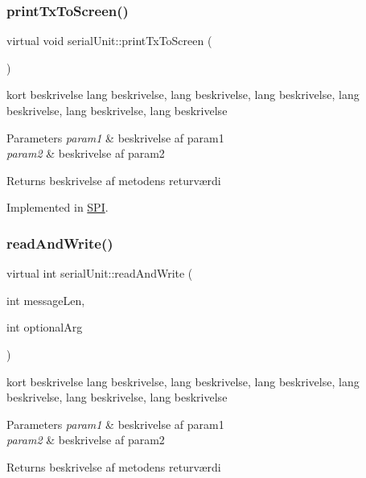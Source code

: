 \subsubsection{\texorpdfstring{print\+Tx\+To\+Screen()}{printTxToScreen()}}
{\footnotesize\ttfamily virtual void serial\+Unit\+::print\+Tx\+To\+Screen (\begin{DoxyParamCaption}{ }\end{DoxyParamCaption})\hspace{0.3cm}{\ttfamily [pure virtual]}}



kort beskrivelse lang beskrivelse, lang beskrivelse, lang beskrivelse, lang beskrivelse, lang beskrivelse, lang beskrivelse 


\begin{DoxyParams}{Parameters}
{\em param1} & beskrivelse af param1 \\
\hline
{\em param2} & beskrivelse af param2 \\
\hline
\end{DoxyParams}
\begin{DoxyReturn}{Returns}
beskrivelse af metodens returværdi 
\end{DoxyReturn}


Implemented in \hyperlink{classSPI_a54c4ecb02366f1e31d2e6f4aa6db8f7d}{S\+PI}.

\mbox{\label{classserialUnit_a5d5573f6d367d8e191df6b8044a81a62}} 
\subsubsection{\texorpdfstring{read\+And\+Write()}{readAndWrite()}}
{\footnotesize\ttfamily virtual int serial\+Unit\+::read\+And\+Write (\begin{DoxyParamCaption}\item[{int}]{message\+Len,  }\item[{int}]{optional\+Arg }\end{DoxyParamCaption})\hspace{0.3cm}{\ttfamily [pure virtual]}}



kort beskrivelse lang beskrivelse, lang beskrivelse, lang beskrivelse, lang beskrivelse, lang beskrivelse, lang beskrivelse 


\begin{DoxyParams}{Parameters}
{\em param1} & beskrivelse af param1 \\
\hline
{\em param2} & beskrivelse af param2 \\
\hline
\end{DoxyParams}
\begin{DoxyReturn}{Returns}
beskrivelse af metodens returværdi 
\end{DoxyReturn}


